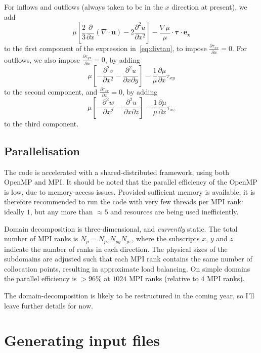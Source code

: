 \documentclass[notitlepage]{revtex4-1}
\begin{document}
For inflows and outflows (always taken to be in the $x$ direction at present), we add 
\begin{equation}\mu\left[\frac{2}{3}\frac{\partial}{\partial{x}}\left(\nabla\cdot\bm{u}\right)-2\frac{\partial^{2}u}{\partial{x}^{2}}\right]-\frac{\nabla\mu}{\mu}\cdot\bm{\tau}\cdot\bm{e_{x}}\end{equation}
to the first component of the expression in~\eqref{eq:divtau}, to impose $\frac{\partial\tau_{xx}}{\partial{x}}=0$.
For outflows, we also impose $\frac{\partial\tau_{yx}}{\partial{x}}=0$, by adding
\begin{equation}\mu\left[-\frac{\partial^{2}v}{\partial{x}^{2}}-\frac{\partial^{2}u}{\partial{x}\partial{y}}\right]-\frac{1}{\mu}\frac{\partial\mu}{\partial{x}}\tau_{xy}\end{equation}
to the second component, and $\frac{\partial\tau_{zx}}{\partial{x}}=0$, by adding
\begin{equation}\mu\left[-\frac{\partial^{2}w}{\partial{x}^{2}}-\frac{\partial^{2}u}{\partial{x}\partial{z}}\right]-\frac{1}{\mu}\frac{\partial\mu}{\partial{x}}\tau_{xz}\end{equation}
to the third component. 


\subsection{Parallelisation}

The code is accelerated with a shared-distributed framework, using both OpenMP and MPI. It should be noted that the parallel efficiency of the OpenMP is low, due to memory-access issues. Provided sufficient memory is available, it is therefore recommended to run the code with very few threads per MPI rank: ideally $1$, but any more than $\approx{5}$ and resources are being used inefficiently.

Domain decomposition is three-dimensional, and \emph{currently} static. The total number of MPI ranks is $N_{p}=N_{px}N_{py}N_{pz}$, where the subscripts $x$, $y$ and $z$ indicate the number of ranks in each direction. The physical sizes of the subdomains are adjusted such that each MPI rank contains the same number of collocation points, resulting in approximate load balancing. On simple domains the parallel efficiency is $>96\%$ at $1024$ MPI ranks (relative to $4$ MPI ranks).

The domain-decomposition is likely to be restructured in the coming year, so I'll leave further details for now.

\section{Generating input files}
\end{document}

